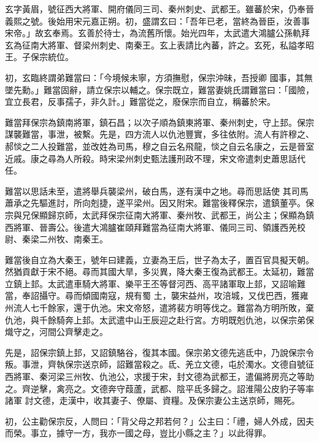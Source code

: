 \begin{pinyinscope}
 玄字黃眉，號征西大將軍、開府儀同三司、秦州刺史、武都王。雖蕃於宋，仍奉晉義熙之號。後始用宋元嘉正朔。初，盛謂玄曰：「吾年已老，當終為晉臣，汝善事宋帝。」故玄奉焉。玄善於待士，為流舊所懷。始光四年，太武遣大鴻臚公孫軌拜玄為征南大將軍、督梁州刺史、南秦王。玄上表請比內蕃，許之。玄死，私謚孝昭王。子保宗統位。



 初，玄臨終謂弟難當曰：「今境候未寧，方須撫慰，保宗沖昧，吾授卿
 國事，其無墜先勳。」難當固辭，請立保宗以輔之。保宗既立，難當妻姚氏謂難當曰：「國險，宜立長君，反事孺子，非久計。」難當從之，廢保宗而自立，稱蕃於宋。



 難當拜保宗為鎮南將軍，鎮石昌；以次子順為鎮東將軍、秦州刺史，守上邽。保宗謀襲難當，事泄，被繫。先是，四方流人以仇池豐實，多往依附。流人有許穆之、郝惔之二人投難當，並改姓為司馬，穆之自云名飛龍，惔之自云名康之，云是晉室近戚。康之尋為人所殺。時宋梁州刺史甄法護刑政不理，宋文帝遣刺史蕭思話代任。



 難當以思話未至，遣將舉兵襲梁州，破白馬，遂有漢中之地。尋而思話使
 其司馬蕭承之先驅進討，所向剋捷，遂平梁州。因又附宋。難當後釋保宗，遣鎮董亭。保宗與兄保顯歸京師，太武拜保宗征南大將軍、秦州牧、武都王，尚公主；保顯為鎮西將軍、晉壽公。後遣大鴻臚崔頤拜難當為征南大將軍、儀同三司、領護西羌校尉、秦梁二州牧、南秦王。



 難當後自立為大秦王，號年曰建義，立妻為王后，世子為太子，置百官具擬天朝。然猶貢獻于宋不絕。尋而其國大旱，多災異，降大秦王復為武都王。太延初，難當立鎮上邽。太武遣車騎大將軍、樂平王丕等督河西、高平諸軍取上邽，又詔喻難當，奉詔攝守。尋而傾國南寇，規有蜀
 土，襲宋益州，攻涪城，又伐巴西，獲雍州流人七千餘家，還于仇池。宋文帝怒，遣將裴方明等伐之。難當為方明所敗，棄仇池，與千餘騎奔上邽。太武遣中山王辰迎之赴行宮。方明既剋仇池，以保宗弟保熾守之，河間公齊擊走之。



 先是，詔保宗鎮上邽，又詔鎮駱谷，復其本國。保宗弟文德先逃氐中，乃說保宗令叛。事泄，齊執保宗送京師，詔難當殺之。氐、羌立文德，屯於濁水。文德自號征西將軍、秦河梁三州牧、仇池公，求援于宋，封文德為武都王，遣偏將房亮之等助之。齊逆擊，禽亮之。文德奔守葭蘆，武都、陰平氐多歸之。詔淮陽公皮豹子等率諸軍
 討文德，走漢中，收其妻子、僚屬、資糧。及保宗妻公主送京師，賜死。



 初，公主勸保宗反，人問曰：「背父母之邦若何？」公主曰：「禮，婦人外成，因夫而榮。事立，據守一方，我亦一國之母，豈比小縣之主？」以此得罪。




\end{pinyinscope}
